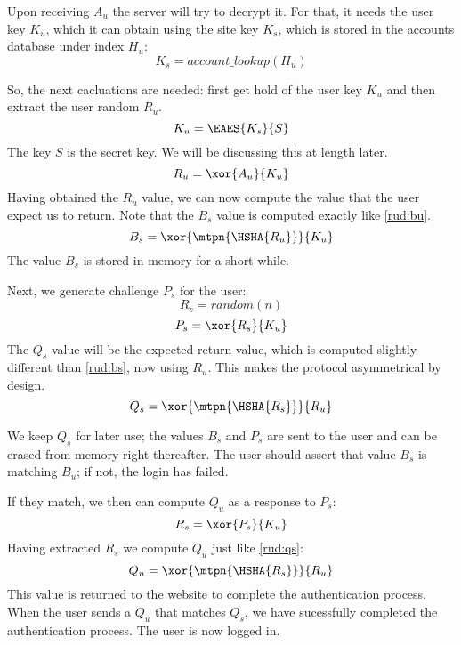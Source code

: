 Upon receiving \(A_u\) the server will try to decrypt it.
For that, it needs the user key \(K_u\), which it can obtain using the site key \(K_s\), which is stored in the accounts database under index \(H_u\):
\begin{equation}
K_s = account\_lookup(H_u)
\end{equation}
\par
So, the next cacluations are needed: first get hold of the user key \(K_u\) and then extract the user random \(R_u\).
\begin{equation}\label{rud:sku}
K_u = \EAES{K_s}{S}
\end{equation}
The key \(S\) is the secret key.
We will be discussing this at length later.
\begin{equation}\label{rud:sru}
R_u = \xor{A_u}{K_u}
\end{equation}
Having obtained the \(R_u\) value, we can now compute the value that the user expect us to return.
Note that the \(B_s\) value is computed exactly like \eqref{rud:bu}.
\begin{equation}\label{rud:bs}
B_s = \xor{\mtpn{\HSHA{R_u}}}{K_u}
\end{equation}
The value \(B_s\) is stored in memory for a short while.
\par
Next, we generate challenge \(P_s\) for the user:
\begin{equation}\label{rud:rs}
R_s = random(n)
\end{equation}
\begin{equation}\label{rud:ps}
P_s = \xor{R_s}{K_u}
\end{equation}
The \(Q_s\) value will be the expected return value, which is computed slightly different than \eqref{rud:bs}, now using \(R_u\).
This makes the protocol asymmetrical by design.
\begin{equation}\label{rud:qs}
Q_s = \xor{\mtpn{\HSHA{R_s}}}{R_u}
\end{equation}
\par
We keep \(Q_s\) for later use; the values \(B_s\) and \(P_s\) are sent to the user and can be erased from memory right thereafter.
The user should assert that value \(B_s\) is  matching \(B_u\);
if not, the login has failed.
\par
If they match, we then can compute \(Q_u\) as a response to \(P_s\):
\begin{equation}
R_s = \xor{P_s}{K_u}
\end{equation}
Having extracted \(R_s\) we compute \(Q_u\) just like \eqref{rud:qs}:
\begin{equation}
Q_u = \xor{\mtpn{\HSHA{R_s}}}{R_u}
\end{equation}
This value is returned to the website to complete the authentication process.
When the user sends a \(Q_u\) that matches \(Q_s\), we have sucessfully completed the authentication process.
The user is now logged in.
